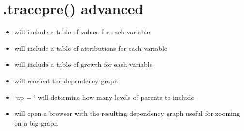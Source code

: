 \documentclass[letterpaper,10pt,english]{jupyterBook}
\begin{document}
\section{.tracepre() advanced}
\label{\detokenize{content/06_ModelAnalytics/AttributionSomeFeatures:tracepre-advanced}}\begin{itemize}
\item {} 
\sphinxAtStartPar
{} will include a table of values for each variable

\item {} 
\sphinxAtStartPar
{} will include a table of attributions for each variable

\item {} 
\sphinxAtStartPar
{} will include a table of growth for each variable

\item {} 
\sphinxAtStartPar
{} will reorient the dependency graph

\item {} 
\sphinxAtStartPar
‘up = ` will determine how many levels of parents to include

\item {} 
\sphinxAtStartPar
{} will open a browser with the resulting dependency graph \sphinxhyphen{} useful for zooming on a big graph

\end{itemize}
\end{document}
